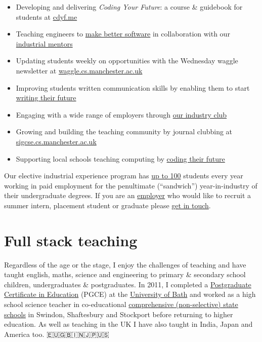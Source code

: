 \documentclass[
  12pt,
]{book}
\providecommand{\tightlist}{%
  \setlength{\itemsep}{0pt}\setlength{\parskip}{0pt}}
\begin{document}
\begin{itemize}
\tightlist
\item
  Developing and delivering \emph{Coding Your Future}: a course \& guidebook for students at \href{https://www.cdyf.me}{cdyf.me}
\item
  Teaching engineers to \href{https://software-eng.netlify.app/}{make better software} in collaboration with our \href{https://www.cs.manchester.ac.uk/connect/business-engagement/industrial-mentoring/}{industrial mentors}
\item
  Updating students weekly on opportunities with the Wednesday waggle newsletter at \href{https://waggle.cs.manchester.ac.uk/waggle/about}{waggle.cs.manchester.ac.uk}
\item
  Improving students written communication skills by enabling them to start \href{https://www.cdyf.me/writing}{writing their future}
\item
  Engaging with a wide range of employers through \href{https://www.cs.manchester.ac.uk/connect/business-engagement/}{our industry club}
\item
  Growing and building the teaching community by journal clubbing at \href{https://sigcse.cs.manchester.ac.uk/}{sigcse.cs.manchester.ac.uk}
\item
  Supporting local schools teaching computing by \href{https://personalpages.manchester.ac.uk/staff/duncan.hull/coding-their-future.html}{coding their future}
\end{itemize}

Our elective industrial experience program has \protect\hyperlink{employability}{up to 100} students every year working in paid employment for the penultimate (``sandwich'') year-in-industry of their undergraduate degrees. If you are an \href{https://personalpages.manchester.ac.uk/staff/duncan.hull/employers.html}{employer} who would like to recruit a summer intern, placement student or graduate please \href{https://personalpages.manchester.ac.uk/staff/duncan.hull/contact.html}{get in touch}. 🐝

\hypertarget{full-stack-teaching}{%
\section*{Full stack teaching}\label{full-stack-teaching}}

Regardless of the age or the stage, I enjoy the challenges of teaching and have taught english, maths, science and engineering to primary \& secondary school children, undergraduates \& postgraduates. In 2011, I completed a \href{https://en.wikipedia.org/wiki/Postgraduate_Certificate_in_Education}{Postgraduate Certificate in Education} (PGCE) at the \href{https://www.bath.ac.uk/}{University of Bath} and worked as a high school science teacher in co-educational \href{https://www.gov.uk/types-of-school}{comprehensive (non-selective) state schools} in Swindon, Shaftesbury and Stockport before returning to higher education. As well as teaching in the UK I have also taught in India, Japan and America too. 🇪🇺🇬🇧🇮🇳🇯🇵🇺🇸
\end{document}
